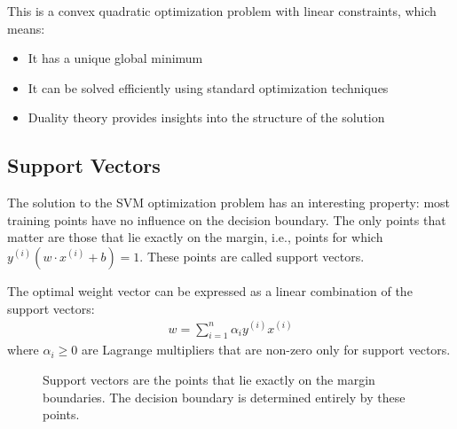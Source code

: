 \documentclass{article}
\begin{document}
This is a convex quadratic optimization problem with linear constraints, which means:
\begin{itemize}
    \item It has a unique global minimum
    \item It can be solved efficiently using standard optimization techniques
    \item Duality theory provides insights into the structure of the solution
\end{itemize}

\subsection{Support Vectors}
The solution to the SVM optimization problem has an interesting property: most training points have no influence on the decision boundary. The only points that matter are those that lie exactly on the margin, i.e., points for which $y^{(i)}(w \cdot x^{(i)} + b) = 1$. These points are called support vectors.

The optimal weight vector can be expressed as a linear combination of the support vectors:
\begin{align}
w = \sum_{i=1}^{n} \alpha_i y^{(i)} x^{(i)}
\end{align}
where $\alpha_i \geq 0$ are Lagrange multipliers that are non-zero only for support vectors.

\begin{figure}[h]
\centering
{}
\caption{Support vectors are the points that lie exactly on the margin boundaries. The decision boundary is determined entirely by these points.}
\end{figure}
\end{document}
